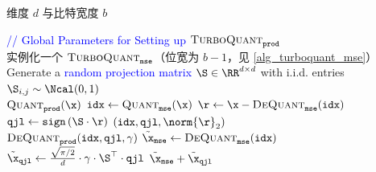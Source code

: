 \documentclass[11pt]{ctexart}
\newcommand{\TurboQuant}{\textsc{TurboQuant}\xspace}
\let\cref\ref
\begin{document}
\begin{algorithm}[t!]
\caption{$\TurboQuant_{\tt prod}$：内积优化}\label{alg_turboquant_prod}
\begin{algorithmic}[1]
    维度 $d$ 与比特宽度 $b$

    {\ttfamily\textcolor{blue}{// Global Parameters for Setting up $\TurboQuant_{\tt prod}$}} \\
    \STATE 实例化一个 {\ttfamily\textcolor{blue}{$\TurboQuant_{\tt mse}$}}（位宽为 $b-1$，见 \cref{alg_turboquant_mse}）\label{turbo_mse}
    \STATE Generate a {\ttfamily\textcolor{blue}{random projection matrix}} $\S \in \RR^{d \times d}$ with i.i.d. entries $\S_{i,j} \sim \Ncal(0, 1)$\label{random_s}
   \\\hrulefill
    $\textsc{Quant}_{\tt prod} ( \x )$
   \STATE ${\tt idx} \gets \textsc{Quant}_{\tt mse}(\x)$
   \STATE $\r \gets \x - \textsc{DeQuant}_{\tt mse}({\tt idx})$ \label{line_residual} \hfill \COMMENT{{\ttfamily\textcolor{blue}{ residual vector}}} 
   \STATE ${\tt qjl} \gets {\tt sign} \left( \S \cdot \r \right)$ \hfill \COMMENT{{\ttfamily\textcolor{blue}{ QJL on residual vector}}}
   $({\tt idx}, {\tt qjl}, \norm{\r}_2)$
   \\\hrulefill
    $\textsc{DeQuant}_{{\tt prod}} ( {\tt idx}, {\tt qjl}, \gamma )$
   \STATE $\tilde{\x}_{\tt mse} \gets \textsc{DeQuant}_{\tt mse}({\tt idx})$ \label{line_tilde_x}
   \STATE $\tilde{\x}_{\tt qjl} \gets \frac{\sqrt{\pi/2}}{d} \cdot \gamma \cdot \S^\top \cdot {\tt qjl}$ \label{line_tilde_x_qjl}
   $\tilde{\x}_{\tt mse} + \tilde{\x}_{\tt qjl}$ \label{output_tilde_x}
\end{algorithmic}
\end{algorithm}
\end{document}
